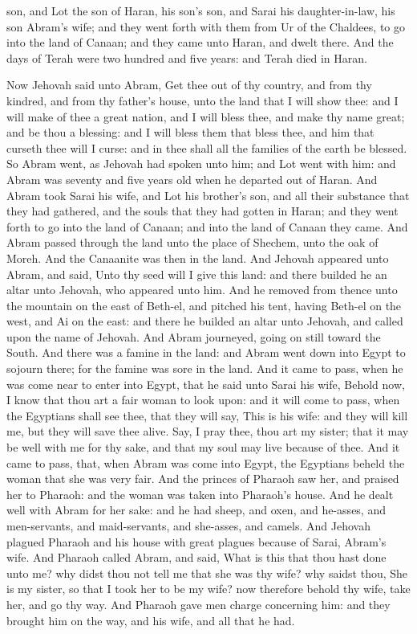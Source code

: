 son, and Lot the son of Haran, his son’s son, and Sarai his daughter-in-law, his son Abram’s wife; and they went forth with them from Ur of the Chaldees, to go into the land of Canaan; and they came unto Haran, and dwelt there. And the days of Terah were two hundred and five years: and Terah died in Haran. 

Now Jehovah said unto Abram, Get thee out of thy country, and from thy kindred, and from thy father’s house, unto the land that I will show thee: and I will make of thee a great nation, and I will bless thee, and make thy name great; and be thou a blessing: and I will bless them that bless thee, and him that curseth thee will I curse: and in thee shall all the families of the earth be blessed. So Abram went, as Jehovah had spoken unto him; and Lot went with him: and Abram was seventy and five years old when he departed out of Haran. And Abram took Sarai his wife, and Lot his brother’s son, and all their substance that they had gathered, and the souls that they had gotten in Haran; and they went forth to go into the land of Canaan; and into the land of Canaan they came. And Abram passed through the land unto the place of Shechem, unto the oak of Moreh. And the Canaanite was then in the land. And Jehovah appeared unto Abram, and said, Unto thy seed will I give this land: and there builded he an altar unto Jehovah, who appeared unto him. And he removed from thence unto the mountain on the east of Beth-el, and pitched his tent, having Beth-el on the west, and Ai on the east: and there he builded an altar unto Jehovah, and called upon the name of Jehovah. And Abram journeyed, going on still toward the South.  And there was a famine in the land: and Abram went down into Egypt to sojourn there; for the famine was sore in the land. And it came to pass, when he was come near to enter into Egypt, that he said unto Sarai his wife, Behold now, I know that thou art a fair woman to look upon: and it will come to pass, when the Egyptians shall see thee, that they will say, This is his wife: and they will kill me, but they will save thee alive. Say, I pray thee, thou art my sister; that it may be well with me for thy sake, and that my soul may live because of thee. And it came to pass, that, when Abram was come into Egypt, the Egyptians beheld the woman that she was very fair. And the princes of Pharaoh saw her, and praised her to Pharaoh: and the woman was taken into Pharaoh’s house. And he dealt well with Abram for her sake: and he had sheep, and oxen, and he-asses, and men-servants, and maid-servants, and she-asses, and camels. And Jehovah plagued Pharaoh and his house with great plagues because of Sarai, Abram’s wife. And Pharaoh called Abram, and said, What is this that thou hast done unto me? why didst thou not tell me that she was thy wife? why saidst thou, She is my sister, so that I took her to be my wife? now therefore behold thy wife, take her, and go thy way. And Pharaoh gave men charge concerning him: and they brought him on the way, and his wife, and all that he had. 

